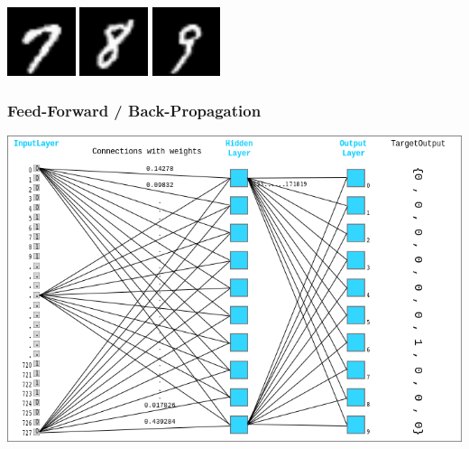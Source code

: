 \documentclass[xcolor=pdftex,dvipsnames,table]{beamer}
\begin{document}
\begin{frame}
		\includegraphics[width=0.15\textwidth]{trainings_sample_example_7.png}
		\includegraphics[width=0.15\textwidth]{trainings_sample_example_8.png}
		\includegraphics[width=0.15\textwidth]{trainings_sample_example_9.png}
		
	\end{frame}


	\begin{frame}
		\frametitle{Feed-Forward / Back-Propagation}
		\includegraphics[width=1\textwidth]{nn.png}
	\end{frame}
\end{document}
